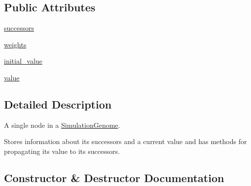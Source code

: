 \subsection*{Public Attributes}
\begin{DoxyCompactItemize}
\item 
\hyperlink{classNEAT__PyGenetics_1_1NEAT_1_1GenomeStructures_1_1SimulationStructure_1_1SimulationNodes_1_1Node_a7eb303cad09b69f01466fd6287c895c4}{successors}
\item 
\hyperlink{classNEAT__PyGenetics_1_1NEAT_1_1GenomeStructures_1_1SimulationStructure_1_1SimulationNodes_1_1Node_a0e8535438a367cd12a2eb47dee280f36}{weights}
\item 
\hyperlink{classNEAT__PyGenetics_1_1NEAT_1_1GenomeStructures_1_1SimulationStructure_1_1SimulationNodes_1_1Node_ae6a237c61d2c2118e6310f254c824490}{initial\+\_\+value}
\item 
\hyperlink{classNEAT__PyGenetics_1_1NEAT_1_1GenomeStructures_1_1SimulationStructure_1_1SimulationNodes_1_1Node_af25b687b957169788a4190545d6dd90c}{value}
\end{DoxyCompactItemize}


\subsection{Detailed Description}
A single node in a \hyperlink{namespaceNEAT__PyGenetics_1_1NEAT_1_1GenomeStructures_1_1SimulationStructure_1_1SimulationGenome}{Simulation\+Genome}. 

Stores information about its successors and a current value and has methods for propagating its value to its successors. 

\subsection{Constructor \& Destructor Documentation}
